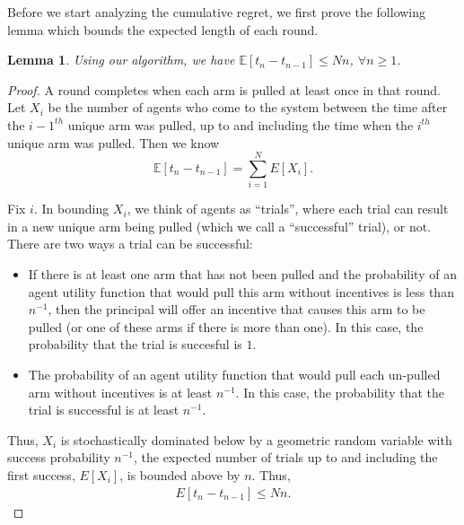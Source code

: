 \documentclass{article}
\newtheorem{lemma}{Lemma}
\begin{document}
Before we start analyzing the cumulative regret, we first prove the following lemma which bounds the expected length of each round.

\begin{lemma}
Using our algorithm, we have $\mathbb{E}[t_{n}-t_{n-1}]\leq Nn$, $\forall n\geq 1$.
\label{round:length}
\end{lemma}


\begin{proof}
	A round completes when each arm is pulled at least once in that round. Let $X_{i}$ be the number of agents who come to the system between the time after the $i-1^{th}$ unique arm was pulled, up to and including the time when the $i^{th}$ unique arm was pulled. Then we know 
\begin{equation*}
\mathbb{E}[t_{n}-t_{n-1}]=\sum_{i=1}^{N}E[X_{i}].
\end{equation*}


Fix $i$. In bounding $X_i$, we think of agents as ``trials'', where each trial can result in a new unique arm being pulled (which we call a ``successful'' trial), or not.  There are two ways a trial can be successful:
\begin{itemize}
\item If there is at least one arm that has not been pulled and the probability of an agent utility function that would pull this arm without incentives is less than $n^{-1}$, then the principal will offer an incentive that causes this arm to be pulled (or one of these arms if there is more than one). In this case, the probability that the trial is succesful is $1$.  
\item The probability of an agent utility function that would pull each un-pulled arm without incentives is at least $n^{-1}$. In this case, the probability that the trial is successful is at least $n^{-1}$.
\end{itemize}

Thus, $X_{i}$ is stochastically dominated below by a geometric random variable with success probability $n^{-1}$, the expected number of trials up to and including the first success, $E[X_i]$, is bounded above by $n$.  Thus,
\begin{align}
E[t_{n}-t_{n-1}]\leq Nn. \nonumber
\end{align}
\end{proof}
\end{document}
